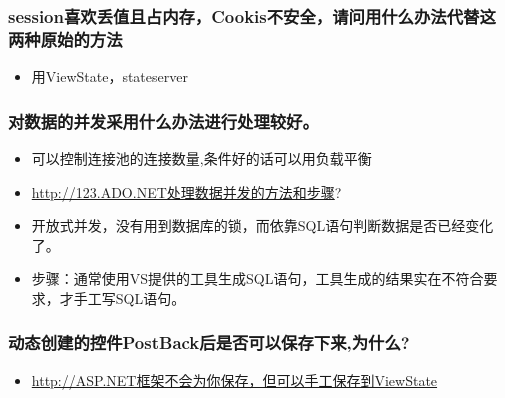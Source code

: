 \documentclass[9pt, b5paper]{article}
\begin{document}
\subsubsection{session喜欢丢值且占内存，Cookis不安全，请问用什么办法代替这两种原始的方法}
\label{sec-1-2-132}
\begin{itemize}
\item 用ViewState，stateserver
\end{itemize}
\subsubsection{对数据的并发采用什么办法进行处理较好。}
\label{sec-1-2-133}
\begin{itemize}
\item 可以控制连接池的连接数量,条件好的话可以用负载平衡
\item \url{http://123.ADO.NET处理数据并发的方法和步骤}?
\item 开放式并发，没有用到数据库的锁，而依靠SQL语句判断数据是否已经变化了。
\item 步骤：通常使用VS提供的工具生成SQL语句，工具生成的结果实在不符合要求，才手工写SQL语句。
\end{itemize}
\subsubsection{动态创建的控件PostBack后是否可以保存下来,为什么?}
\label{sec-1-2-134}
\begin{itemize}
\item \url{http://ASP.NET框架不会为你保存，但可以手工保存到ViewState}
\end{itemize}
\end{document}
